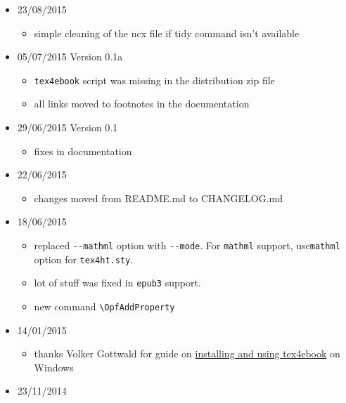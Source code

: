\begin{itemize}
  \begin{itemize}
  \tightlist
  \item
    fatal error happened with epub3 when the document didn't contain the
    TOC
  \end{itemize}
\item
  23/08/2015

  \begin{itemize}
  \tightlist
  \item
    simple cleaning of the ncx file if tidy command isn't available
  \end{itemize}
\item
  05/07/2015 Version 0.1a

  \begin{itemize}
  \tightlist
  \item
    \texttt{tex4ebook} script was missing in the distribution zip file
  \item
    all links moved to footnotes in the documentation
  \end{itemize}
\item
  29/06/2015 Version 0.1

  \begin{itemize}
  \tightlist
  \item
    fixes in documentation
  \end{itemize}
\item
  22/06/2015

  \begin{itemize}
  \tightlist
  \item
    changes moved from README.md to CHANGELOG.md
  \end{itemize}
\item
  18/06/2015

  \begin{itemize}
  \tightlist
  \item
    replaced \texttt{-\/-mathml} option with \texttt{-\/-mode}. For
    \texttt{mathml} support, use\texttt{mathml} option for
    \texttt{tex4ht.sty}.
  \item
    lot of stuff was fixed in \texttt{epub3} support.
  \item
    new command \texttt{\textbackslash{}OpfAddProperty}
  \end{itemize}
\item
  14/01/2015

  \begin{itemize}
  \tightlist
  \item
    thanks Volker Gottwald for guide on
    \href{https://d800fotos.wordpress.com/2015/01/19/create-e-books-from-latex-tex-files-ebook-aus-latex-tex-dateien-erstellen/}{installing
    and using tex4ebook} on Windows
  \end{itemize}
\item
  23/11/2014


\end{itemize}
